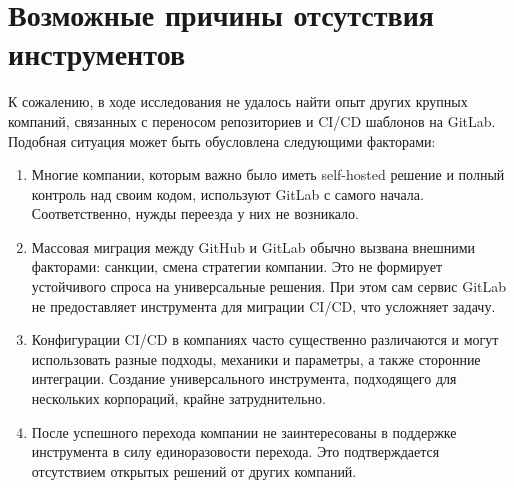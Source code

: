 \section{Возможные причины отсутствия инструментов} \label{sec:instrument-absence}
К сожалению, в ходе исследования не удалось найти опыт других крупных компаний, связанных с переносом репозиториев и CI/CD шаблонов на GitLab.
Подобная ситуация может быть обусловлена следующими факторами:
\begin{enumerate}
  \item Многие компании, которым важно было иметь self-hosted решение и полный контроль над своим кодом, используют GitLab с самого начала.
        Соответственно, нужды переезда у них не возникало.

  \item Массовая миграция между GitHub и GitLab обычно вызвана внешними факторами: санкции, смена стратегии компании.
        Это не формирует устойчивого спроса на универсальные решения.
        При этом сам сервис GitLab не предоставляет инструмента для миграции CI/CD, что усложняет задачу.

  \item Конфигурации CI/CD в компаниях часто существенно различаются и могут использовать разные подходы,
        механики и параметры, а также сторонние интеграции.
        Создание универсального инструмента, подходящего для нескольких корпораций, крайне затруднительно.

  \item После успешного перехода компании не заинтересованы в поддержке инструмента в силу единоразовости перехода.
        Это подтверждается отсутствием открытых решений от других компаний.
\end{enumerate}

